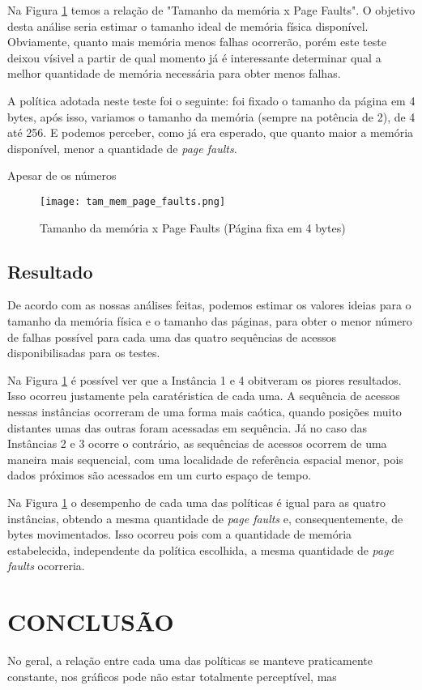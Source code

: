 \documentclass[12pt]{article}
\begin{document}
Na Figura \ref{tam_mem_page_faults} temos a relação de "Tamanho da memória x Page Faults". O objetivo desta análise seria estimar o tamanho ideal de memória física disponível. Obviamente, quanto mais memória menos falhas ocorrerão, porém este teste deixou vísivel a partir de qual momento já é interessante determinar qual a melhor quantidade de memória necessária para obter menos falhas.

A política adotada neste teste foi o seguinte: foi fixado o tamanho da página em 4 bytes, após isso, variamos o tamanho da memória (sempre na potência de 2), de 4 até 256. E podemos perceber, como já era esperado, que quanto maior a memória disponível, menor a quantidade de \textit{page faults}.

Apesar de os números


   \begin{figure}
        \centering
        \texttt{[image: tam\_mem\_page\_faults.png]}
        \caption{Tamanho da memória x Page Faults (Página fixa em 4 bytes)}
        \label{tam_mem_page_faults}
    \end{figure}


\subsection{Resultado}

De acordo com as nossas análises feitas, podemos estimar os valores ideias para o tamanho da memória física e o tamanho das páginas, para obter o menor número de falhas possível para cada uma das quatro sequências de acessos disponibilisadas para os testes.

Na Figura \ref{tam_mem_page_faults} é possível ver que a Instância 1 e 4 obitveram os piores resultados. Isso ocorreu justamente pela caratéristica de cada uma. A sequência de acessos nessas instâncias ocorreram de uma forma mais caótica, quando posições muito distantes umas das outras foram acessadas em sequência. Já no caso das Instâncias 2 e 3 ocorre o contrário, as sequências de acessos ocorrem de uma maneira mais sequencial, com uma localidade de referência espacial menor, pois dados próximos são acessados em um curto espaço de tempo.

Na Figura \ref{tam_mem_page_faults} o desempenho de cada uma das políticas é igual para as quatro instâncias, obtendo a mesma quantidade de \textit{page faults} e, consequentemente, de bytes movimentados. Isso ocorreu pois com a quantidade de memória estabelecida, independente da política escolhida, a mesma quantidade de \textit{page faults} ocorreria.


\section{CONCLUSÃO}
\label{conclusao}

No geral, a relação entre cada uma das políticas se manteve praticamente constante, nos gráficos pode não estar totalmente perceptível, mas



\end{document}

